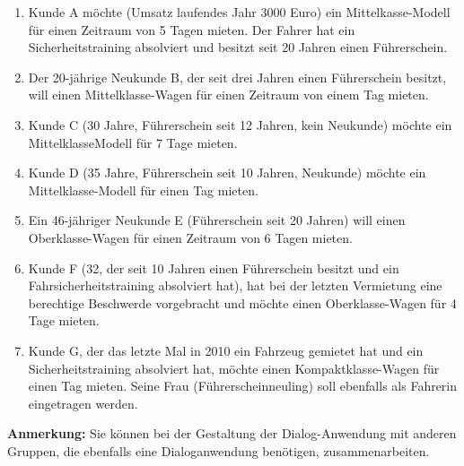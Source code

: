 \begin{enumerate}
\item Kunde A möchte (Umsatz laufendes Jahr 3000 Euro) ein Mittelkasse-Modell für einen
Zeitraum von 5 Tagen mieten. Der Fahrer hat ein Sicherheitstraining absolviert und besitzt
seit 20 Jahren einen Führerschein.
\item Der 20-jährige Neukunde B, der seit drei Jahren einen Führerschein besitzt, will einen
Mittelklasse-Wagen für einen Zeitraum von einem Tag mieten.
\item Kunde C (30 Jahre, Führerschein seit 12 Jahren, kein Neukunde) möchte ein MittelklasseModell
für 7 Tage mieten.
\item Kunde D (35 Jahre, Führerschein seit 10 Jahren, Neukunde) möchte ein Mittelklasse-Modell
für einen Tag mieten.
\item Ein 46-jähriger Neukunde E (Führerschein seit 20 Jahren) will einen Oberklasse-Wagen für
einen Zeitraum von 6 Tagen mieten.
\item Kunde F (32, der seit 10 Jahren einen Führerschein besitzt und ein Fahrsicherheitstraining
absolviert hat), hat bei der letzten Vermietung eine berechtige Beschwerde vorgebracht und
möchte einen Oberklasse-Wagen für 4 Tage mieten.
\item Kunde G, der das letzte Mal in 2010 ein Fahrzeug gemietet hat und ein Sicherheitstraining
absolviert hat, möchte einen Kompaktklasse-Wagen für einen Tag mieten. Seine Frau
(Führerscheinneuling) soll ebenfalls als Fahrerin eingetragen werden.
\end{enumerate}

\textbf{Anmerkung:} Sie können bei der Gestaltung der Dialog-Anwendung mit anderen Gruppen, die
ebenfalls eine Dialoganwendung benötigen, zusammenarbeiten.


